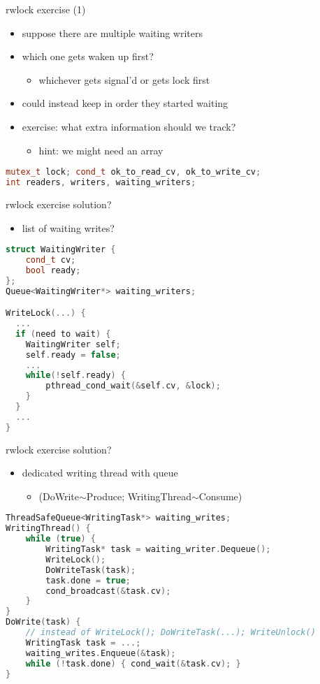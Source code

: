 \begin{frame}[fragile,label=rwLockExercise]{rwlock exercise (1)}
\begin{itemize}
\item suppose there are multiple waiting writers
\item which one gets waken up first?
    \begin{itemize}
    \item whichever gets signal'd or gets lock first
    \end{itemize}
\vspace{.5cm}
\item could instead keep in order they started waiting
\item exercise: what extra information should we track?
    \begin{itemize}
    \item hint: we might need an array
    \end{itemize}
\end{itemize}
\begin{lstlisting}[language=C++,style=smaller]
mutex_t lock; cond_t ok_to_read_cv, ok_to_write_cv;
int readers, writers, waiting_writers;
\end{lstlisting}
\end{frame}

\begin{frame}[fragile,label=rwLockExerciseOpt1]{rwlock exercise solution?}
\begin{itemize}
\item list of waiting writes?
\end{itemize}
\begin{lstlisting}[language=C++,style=smaller]
struct WaitingWriter {
    cond_t cv;
    bool ready;
};
Queue<WaitingWriter*> waiting_writers;

WriteLock(...) {
  ...
  if (need to wait) {
    WaitingWriter self;
    self.ready = false;
    ...
    while(!self.ready) {
        pthread_cond_wait(&self.cv, &lock);
    }
  }
  ...
}
\end{lstlisting}
\end{frame}

\begin{frame}[fragile,label=rwLockExerciseOpt2]{rwlock exercise solution?}
\begin{itemize}
\item dedicated writing thread with queue 
    \begin{itemize}
        \item (DoWrite$\sim$Produce; WritingThread$\sim$Consume)
    \end{itemize}
\end{itemize}
\begin{lstlisting}[language=C++,style=smaller]
ThreadSafeQueue<WritingTask*> waiting_writes;
WritingThread() {
    while (true) {
        WritingTask* task = waiting_writer.Dequeue();
        WriteLock();
        DoWriteTask(task);
        task.done = true;
        cond_broadcast(&task.cv);
    }
}
DoWrite(task) {
    // instead of WriteLock(); DoWriteTask(...); WriteUnlock()
    WritingTask task = ...;
    waiting_writes.Enqueue(&task);
    while (!task.done) { cond_wait(&task.cv); }
}
\end{lstlisting}
\end{frame}
